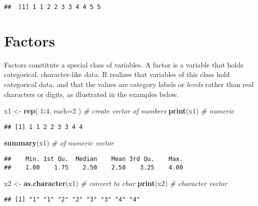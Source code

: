 \documentclass[]{book}
\newenvironment{Shaded}{\begin{snugshade}}{\end{snugshade}}
\newcommand{\CommentTok}[1]{\textcolor[rgb]{0.56,0.35,0.01}{\textit{#1}}}
\newcommand{\DataTypeTok}[1]{\textcolor[rgb]{0.13,0.29,0.53}{#1}}
\newcommand{\DecValTok}[1]{\textcolor[rgb]{0.00,0.00,0.81}{#1}}
\newcommand{\KeywordTok}[1]{\textcolor[rgb]{0.13,0.29,0.53}{\textbf{#1}}}
\newcommand{\NormalTok}[1]{#1}
\newcommand{\OperatorTok}[1]{\textcolor[rgb]{0.81,0.36,0.00}{\textbf{#1}}}
\newcommand{\StringTok}[1]{\textcolor[rgb]{0.31,0.60,0.02}{#1}}
\begin{document}
\begin{verbatim}
##  [1] 1 1 2 2 3 3 4 4 5 5
\end{verbatim}

\hypertarget{sec:factors}{%
\section{Factors}\label{sec:factors}}

Factors constitute a special class of variables. A factor is a variable
that holds categorical, character-like data. R realizes
that variables of this class hold categorical data, and that the values
are category labels or \emph{levels} rather than real characters or digits,
as illustrated in the examples below.

\begin{Shaded}
\begin{Highlighting}[]
\NormalTok{x1 <-}\StringTok{ }\KeywordTok{rep}\NormalTok{( }\DecValTok{1}\OperatorTok{:}\DecValTok{4}\NormalTok{, }\DataTypeTok{each=}\DecValTok{2}\NormalTok{ ) }\CommentTok{# create vector of numbers}
\KeywordTok{print}\NormalTok{(x1) }\CommentTok{# numeric}
\end{Highlighting}
\end{Shaded}

\begin{verbatim}
## [1] 1 1 2 2 3 3 4 4
\end{verbatim}

\begin{Shaded}
\begin{Highlighting}[]
\KeywordTok{summary}\NormalTok{(x1) }\CommentTok{# of numeric vector}
\end{Highlighting}
\end{Shaded}

\begin{verbatim}
##    Min. 1st Qu.  Median    Mean 3rd Qu.    Max. 
##    1.00    1.75    2.50    2.50    3.25    4.00
\end{verbatim}

\begin{Shaded}
\begin{Highlighting}[]
\NormalTok{x2 <-}\StringTok{ }\KeywordTok{as.character}\NormalTok{(x1) }\CommentTok{# convert to char}
\KeywordTok{print}\NormalTok{(x2) }\CommentTok{# character vector}
\end{Highlighting}
\end{Shaded}

\begin{verbatim}
## [1] "1" "1" "2" "2" "3" "3" "4" "4"
\end{verbatim}
\end{document}
